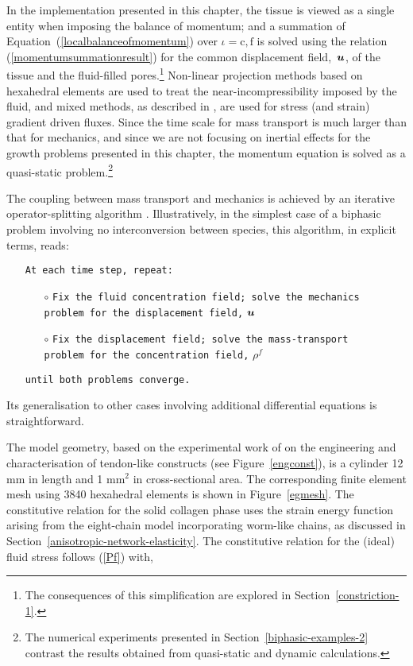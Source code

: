 In the implementation presented in this chapter, the tissue is viewed
as a single entity when imposing the balance of momentum; and a
summation of Equation~(\ref{localbalanceofmomentum}) over
$\iota=\mathrm{c,f}$ is solved using the relation
(\ref{momentumsummationresult}) for the common displacement
\mbox{field, $\mbox{\boldmath$ u$}$,} of the tissue and the fluid-filled
pores.\footnote{The consequences of this simplification are explored
  in Section~\ref{constriction-1}.} Non-linear projection methods
\citep{simotaylorpister:85} based on hexahedral elements are used to
treat the near-incompressibility imposed by the fluid, and mixed
methods, as described in \cite{Garikipatiox2:01}, are used for stress
(and strain) gradient driven fluxes. Since the time scale for mass
transport is much larger than that for mechanics, and since we are not
focusing on inertial effects for the growth problems presented in this
chapter, the momentum equation is solved as a quasi-static
problem.\footnote{The numerical experiments presented in
  Section~\ref{biphasic-examples-2} contrast the results obtained from
  quasi-static and dynamic calculations.}

The coupling between mass transport and mechanics is achieved by an
iterative operator-splitting algorithm
\citep{Armero-poroplasticity:99, Garikipatietal:01}. Illustratively,
in the simplest case of a biphasic problem involving no
interconversion between species, this algorithm, in explicit terms,
reads:

\begin{itemize}
\item[] {\tt At each time step, repeat:}
  \begin{itemize}
  \item[$\circ$] {\tt Fix the fluid concentration field; solve the
    mechanics\\ problem for the displacement field,} $\mbox{\boldmath$ u$}$
  \item[$\circ$] {\tt Fix the displacement field; solve the
    mass-transport\\ problem for the concentration field,} $\rho^f$
  \end{itemize}
\item[]{\tt until both problems converge.}
\end{itemize}

\noindent Its generalisation to other cases involving additional
differential equations is straightforward.

The model geometry, based on the experimental work of \citet{Calve:04}
on the engineering and characterisation of tendon-like constructs (see
Figure~\ref{engconst}), is a cylinder 12 mm in length and 1 mm$^2$ in
cross-sectional area. The corresponding finite element mesh using 3840
hexahedral elements is shown in Figure~\ref{egmesh}. The constitutive
relation for the solid collagen phase uses the strain energy function
arising from the eight-chain model incorporating worm-like chains, as
discussed in Section~\ref{anisotropic-network-elasticity}. The
constitutive relation for the (ideal) fluid stress follows (\ref{Pf})
with,


